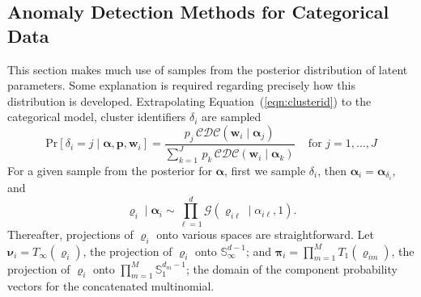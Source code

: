 \subsection{Anomaly Detection Methods for Categorical Data\label{subsec:catscores}}
This section makes much use of samples from the posterior distribution of
    latent parameters.  Some explanation is required regarding precisely how 
    this distribution is developed.  Extrapolating Equation~(\ref{eqn:clusterid})
    to the categorical model, cluster identifiers $\delta_i$ are sampled
    \begin{equation}
        \label{eqn:latentposterior}
        \text{Pr}[\delta_i = j\mid \bm{\alpha}, \bm{p}, \bm{w}_i] = \frac{p_j\,\mathcal{CDC}\left(\bm{w}_i\mid\bm{\alpha}_j\right)}{\sum_{k = 1}^J\,p_k\,\mathcal{CDC}\left(\bm{w}_i\mid\bm{\alpha}_k\right)}
            \;\;\;\text{ for }j = 1, \ldots, J
    \end{equation}
    For a given sample from the posterior for $\bm{\alpha}$,
    first we sample $\delta_i$, then $\bm{\alpha}_i = \bm{\alpha}_{\delta_i}$, and
    \begin{equation}
        \label{eqn:postpredrho}
        \bm{\varrho}_i\mid\bm{\alpha}_i \sim 
        \prod_{\ell = 1}^d\mathcal{G}\left(\varrho_{i\ell}\mid\alpha_{i\ell}, 1\right).
    \end{equation}
    Thereafter, projections of $\bm{\varrho}_i$ onto various spaces are straightforward.
    Let $\bm{\nu}_i = T_{\infty}(\bm{\varrho}_i)$, the projection of $\bm{\varrho}_i$ 
    onto $\mathbb{S}_{\infty}^{d-1}$; and 
    $\bm{\pi}_i = \prod_{m=1}^{M}T_1(\bm{\varrho}_{im})$, 
    the projection of $\bm{\varrho}_i$ onto $\prod_{m = 1}^M\mathbb{S}_1^{{d_m}-1}$; 
    the domain of the component probability vectors for the concatenated multinomial.

